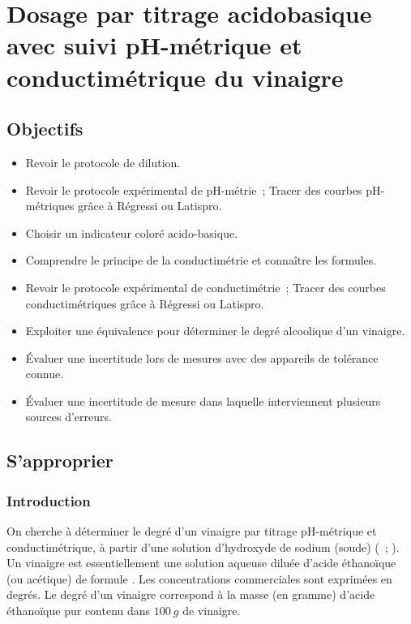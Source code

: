 \documentclass[a4paper, 10pt, final, garamond]{book}
\begin{document}
\setcounter{chapter}{20}

\chapter{Dosage par titrage acidobasique avec suivi pH-m\'etrique et
conductim\'etrique du vinaigre}

\section{Objectifs}

\begin{itemize}
    \item Revoir le protocole de dilution.
    \item Revoir le protocole expérimental de pH-métrie~; Tracer des courbes 
        pH-métriques grâce à Régressi ou Latispro.
    \item Choisir un indicateur coloré acido-basique.
    \item Comprendre le principe de la conductimétrie et connaître les formules.
    \item Revoir le protocole expérimental de conductimétrie~; Tracer des
        courbes conductimétriques grâce à Régressi ou Latispro.
    \item Exploiter une équivalence pour déterminer le degré alcoolique d'un
        vinaigre.
    \item Évaluer une incertitude lors de mesures avec des appareils de
        tolérance connue.
    \item Évaluer une incertitude de mesure dans laquelle interviennent
        plusieurs sources d'erreurs.
\end{itemize}

\section{S'approprier}
\subsection{Introduction}

On cherche à déterminer le degré d'un vinaigre par titrage pH-métrique et
conductimétrique, à partir d'une solution d'hydroxyde de sodium (soude)
(~; ). Un vinaigre est essentiellement une solution aqueuse
diluée d'acide éthanoïque (ou acétique) de formule . Les
concentrations commerciales sont exprimées en degrés. Le degré d'un vinaigre
correspond à la masse (en gramme) d'acide éthanoïque pur contenu dans
$\SI{100}{g}$ de vinaigre.
\end{document}
